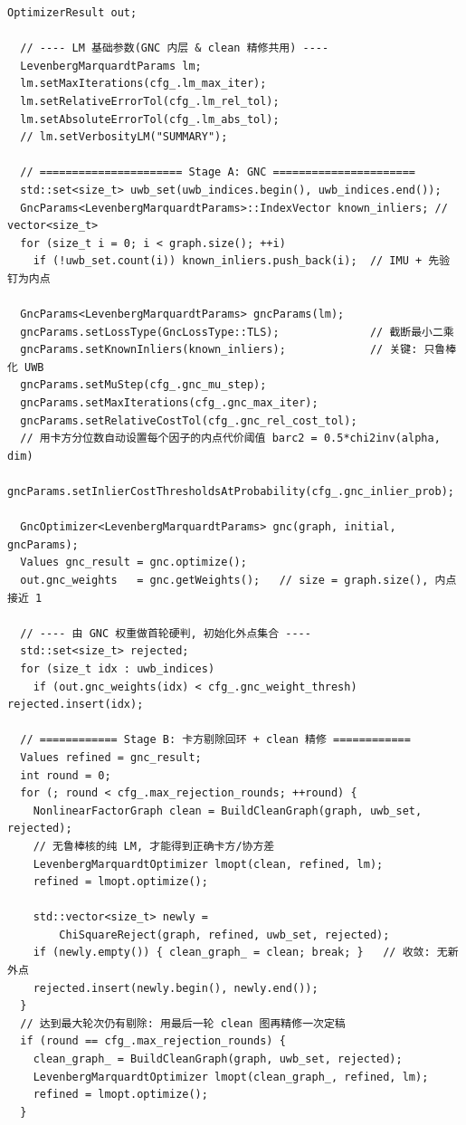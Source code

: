 \documentclass[11pt,a4paper]{report}
\begin{document}
\begin{lstlisting}[style=cpp]
  OptimizerResult out;

  // ---- LM 基础参数(GNC 内层 & clean 精修共用) ----
  LevenbergMarquardtParams lm;
  lm.setMaxIterations(cfg_.lm_max_iter);
  lm.setRelativeErrorTol(cfg_.lm_rel_tol);
  lm.setAbsoluteErrorTol(cfg_.lm_abs_tol);
  // lm.setVerbosityLM("SUMMARY");

  // ====================== Stage A: GNC ======================
  std::set<size_t> uwb_set(uwb_indices.begin(), uwb_indices.end());
  GncParams<LevenbergMarquardtParams>::IndexVector known_inliers; // vector<size_t>
  for (size_t i = 0; i < graph.size(); ++i)
    if (!uwb_set.count(i)) known_inliers.push_back(i);  // IMU + 先验 钉为内点

  GncParams<LevenbergMarquardtParams> gncParams(lm);
  gncParams.setLossType(GncLossType::TLS);              // 截断最小二乘
  gncParams.setKnownInliers(known_inliers);             // 关键: 只鲁棒化 UWB
  gncParams.setMuStep(cfg_.gnc_mu_step);
  gncParams.setMaxIterations(cfg_.gnc_max_iter);
  gncParams.setRelativeCostTol(cfg_.gnc_rel_cost_tol);
  // 用卡方分位数自动设置每个因子的内点代价阈值 barc2 = 0.5*chi2inv(alpha, dim)
  gncParams.setInlierCostThresholdsAtProbability(cfg_.gnc_inlier_prob);

  GncOptimizer<LevenbergMarquardtParams> gnc(graph, initial, gncParams);
  Values gnc_result = gnc.optimize();
  out.gnc_weights   = gnc.getWeights();   // size = graph.size(), 内点接近 1

  // ---- 由 GNC 权重做首轮硬判, 初始化外点集合 ----
  std::set<size_t> rejected;
  for (size_t idx : uwb_indices)
    if (out.gnc_weights(idx) < cfg_.gnc_weight_thresh) rejected.insert(idx);

  // ============ Stage B: 卡方剔除回环 + clean 精修 ============
  Values refined = gnc_result;
  int round = 0;
  for (; round < cfg_.max_rejection_rounds; ++round) {
    NonlinearFactorGraph clean = BuildCleanGraph(graph, uwb_set, rejected);
    // 无鲁棒核的纯 LM, 才能得到正确卡方/协方差
    LevenbergMarquardtOptimizer lmopt(clean, refined, lm);
    refined = lmopt.optimize();

    std::vector<size_t> newly =
        ChiSquareReject(graph, refined, uwb_set, rejected);
    if (newly.empty()) { clean_graph_ = clean; break; }   // 收敛: 无新外点
    rejected.insert(newly.begin(), newly.end());
  }
  // 达到最大轮次仍有剔除: 用最后一轮 clean 图再精修一次定稿
  if (round == cfg_.max_rejection_rounds) {
    clean_graph_ = BuildCleanGraph(graph, uwb_set, rejected);
    LevenbergMarquardtOptimizer lmopt(clean_graph_, refined, lm);
    refined = lmopt.optimize();
  }


\end{lstlisting}
\end{document}
